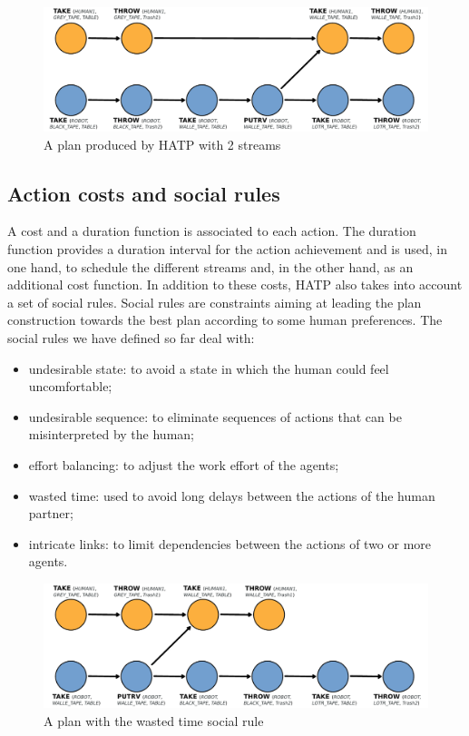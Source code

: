 \documentclass{svmult}
\begin{document}
\begin{figure}[htbp]
  \centering
  \includegraphics[width=0.95\columnwidth]{./figs/plan1.pdf}
  \caption{A plan produced by HATP with 2 streams}
  \label{plan_hatp1}
\end{figure}

\subsection*{Action costs and social rules}

A cost and a duration function is associated to each action.  The duration
function provides a duration interval for the action achievement and is used,
in one hand, to schedule the different streams and, in the other hand, as an
additional cost function.  In addition to these costs, HATP also takes into
account a set of social rules.  Social rules are constraints aiming at leading
the plan construction towards the best plan according to some human
preferences. The social rules we have defined so far deal with:

\begin{itemize}
\item undesirable state: to avoid a state in which the human could
  feel uncomfortable;
\item undesirable sequence: to eliminate sequences of actions that can
  be misinterpreted by the human;
\item effort balancing: to adjust the work effort of the agents;
\item wasted time: used to avoid long delays between the actions of
  the human partner;
\item intricate links: to limit dependencies between the actions of
  two or more agents.
\end{itemize}

\begin{figure}[htbp]
  \centering
  \includegraphics[width=0.95\columnwidth]{./figs/plan2.pdf}
  \caption{A plan with the wasted time social rule}
  \label{plan_hatp2}
\end{figure}
\end{document}
